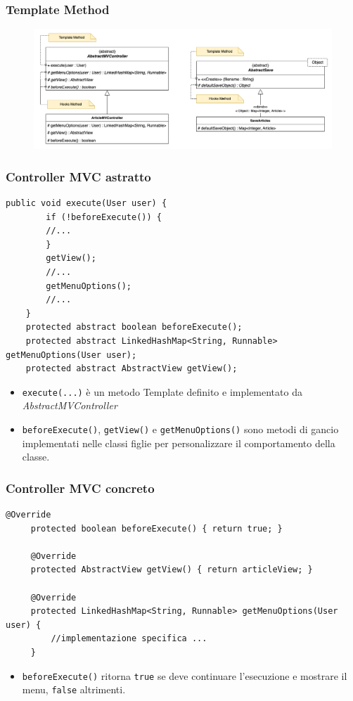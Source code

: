 \begin{frame}
    \frametitle{Template Method}
    \begin{figure}
        \includegraphics[width=1\textwidth]{img/templateMethod.png}
    \end{figure}
\end{frame}

\begin{frame} [fragile]
    \frametitle{Controller MVC astratto}
    \begin{lstlisting}[autogobble, title={\texttt{AbstractMVController.java}}, morekeywords={beforeExecute, getView, getMenuOptions}]
    public void execute(User user) {
        if (!beforeExecute()) {
        //...
        }
        getView();
        //...
        getMenuOptions();
        //...
    }
    protected abstract boolean beforeExecute();
    protected abstract LinkedHashMap<String, Runnable> getMenuOptions(User user);
    protected abstract AbstractView getView();
    \end{lstlisting}
    \begin{itemize}
        \item \texttt{execute(...)} è un metodo Template definito e implementato da \emph{AbstractMVController}
        \item \texttt{beforeExecute()}, \texttt{getView()} e \texttt{getMenuOptions()} sono metodi di gancio
        implementati nelle classi figlie per personalizzare il comportamento della classe.
    \end{itemize}
\end{frame}

\begin{frame} [fragile]
 \frametitle{Controller MVC concreto}
   \begin{lstlisting}[autogobble, title={\texttt{ArticleMVController.java}}]
     @Override
     protected boolean beforeExecute() { return true; }

     @Override
     protected AbstractView getView() { return articleView; }

     @Override
     protected LinkedHashMap<String, Runnable> getMenuOptions(User user) {
         //implementazione specifica ...
     }
   \end{lstlisting}
    \begin{itemize}
        \item \texttt{beforeExecute()} ritorna \texttt{true} se deve continuare l'esecuzione
        e mostrare il menu, \texttt{false} altrimenti.
    \end{itemize}
\end{frame}
